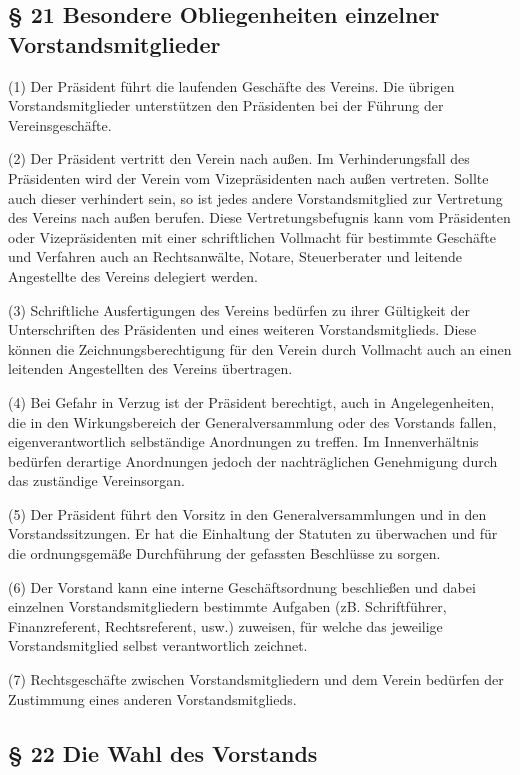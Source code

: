 \documentclass[11pt,a4paper]{article}
\begin{document}
\subsection{§ 21
Besondere Obliegenheiten einzelner Vorstandsmitglieder}

(1)
Der Präsident führt die laufenden Geschäfte des Vereins.
Die übrigen Vorstandsmitglieder unterstützen den Präsidenten bei der Führung der Vereinsgeschäfte.

(2)
Der Präsident vertritt den Verein nach außen.
Im Verhinderungsfall des Präsidenten wird der Verein vom Vizepräsidenten nach außen vertreten.
Sollte auch dieser verhindert sein, so ist jedes andere Vorstandsmitglied zur Vertretung des Vereins nach außen berufen.
Diese Vertretungsbefugnis kann vom Präsidenten oder Vizepräsidenten mit einer schriftlichen Vollmacht für bestimmte Geschäfte und Verfahren auch an Rechtsanwälte, Notare, Steuerberater und leitende Angestellte des Vereins delegiert werden.

(3)
Schriftliche Ausfertigungen des Vereins bedürfen zu ihrer Gültigkeit der Unterschriften des Präsidenten und eines weiteren Vorstandsmitglieds.
Diese können die Zeichnungsberechtigung für den Verein durch Vollmacht auch an einen leitenden Angestellten des Vereins übertragen.

(4)
Bei Gefahr in Verzug ist der Präsident berechtigt, auch in Angelegenheiten, die in den Wirkungsbereich der Generalversammlung oder des Vorstands fallen, eigenverantwortlich selbständige Anordnungen zu treffen.
Im Innenverhältnis bedürfen derartige Anordnungen jedoch der nachträglichen Genehmigung durch das zuständige Vereinsorgan.

(5)
Der Präsident führt den Vorsitz in den Generalversammlungen und in den Vorstandssitzungen.
Er hat die Einhaltung der Statuten zu überwachen und für die ordnungsgemäße Durchführung der gefassten Beschlüsse zu sorgen.

(6)
Der Vorstand kann eine interne Geschäftsordnung beschließen und dabei einzelnen Vorstandsmitgliedern bestimmte Aufgaben (zB. Schriftführer, Finanzreferent, Rechtsreferent, usw.) zuweisen, für welche das jeweilige Vorstandsmitglied selbst verantwortlich zeichnet.

(7)
Rechtsgeschäfte zwischen Vorstandsmitgliedern und dem Verein bedürfen der Zustimmung eines anderen Vorstandsmitglieds.

\subsection{§ 22
Die Wahl des Vorstands}
\end{document}
